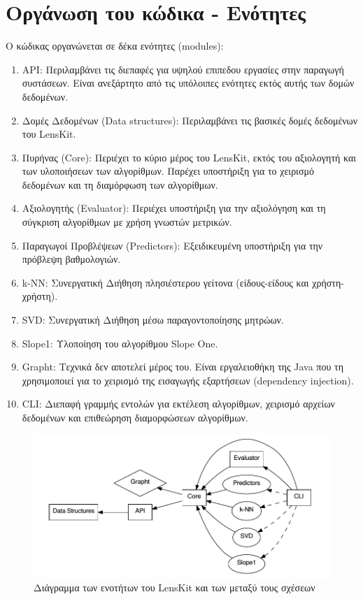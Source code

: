 \section{Οργάνωση του κώδικα - Ενότητες}
Ο κώδικας οργανώνεται σε δέκα ενότητες ({\en modules}):
\begin{enumerate}
 \item {\en API}: Περιλαμβάνει τις διεπαφές για υψηλού επιπεδου εργασίες στην παραγωγή συστάσεων. Είναι ανεξάρτητο από τις υπόλοιπες ενότητες εκτός αυτής των δομών δεδομένων.
 \item Δομές Δεδομένων ({\en Data structures}): Περιλαμβάνει τις βασικές δομές δεδομένων του {\en LensKit}.
 \item Πυρήνας ({\en Core}): Περιέχει το κύριο μέρος του {\en LensKit}, εκτός του αξιολογητή και των υλοποιήσεων των αλγορίθμων. Παρέχει υποστήριξη για το χειρισμό δεδομένων και τη διαμόρφωση των αλγορίθμων.
 \item Αξιολογητής ({\en Evaluator}): Περιέχει υποστήριξη για την αξιολόγηση και τη σύγκριση αλγορίθμων με χρήση γνωστών μετρικών.
 \item Παραγωγοί Προβλέψεων ({\en Predictors}): Εξειδικευμένη υποστήριξη για την πρόβλεψη βαθμολογιών.
 \item {\en k-NN}: Συνεργατική Διήθηση πλησιέστερου γείτονα (είδους-είδους και χρήστη-χρήστη).
 \item {\en SVD}: Συνεργατική Διήθηση μέσω παραγοντοποίησης μητρώων. 
 \item {\en Slope1:} Υλοποίηση του αλγορίθμου {\en Slope One}.
 \item {\en Grapht}: Τεχνικά δεν αποτελεί μέρος του. Είναι εργαλειοθήκη της {\en Java} που τη χρησιμοποιεί για το χειρισμό της εισαγωγής εξαρτήσεων ({\en dependency injection}).
 \item {\en CLI:} Διεπαφή γραμμής εντολών για εκτέλεση αλγορίθμων, χειρισμό αρχείων δεδομένων και επιθεώρηση διαμορφώσεων αλγορίθμων.
\end{enumerate}
\begin{figure}[H]
\includegraphics[scale=0.5]{images/st.png}
\caption{Διάγραμμα των ενοτήτων του {\en LensKit} και των μεταξύ τους σχέσεων \cite{ekstrand_towards_2014}}
\end{figure}
